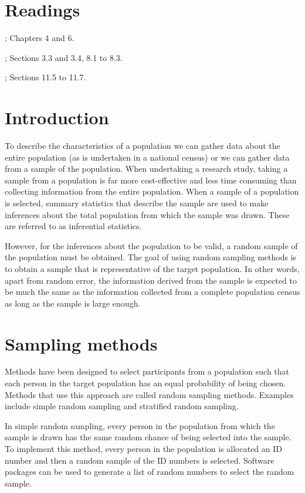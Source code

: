 \documentclass[
]{memoir}
\begin{document}
\hypertarget{readings-2}{%
\section*{Readings}\label{readings-2}}

\citet{kirkwood_sterne01}; Chapters 4 and 6.

\citet{bland15}; Sections 3.3 and 3.4, 8.1 to 8.3.

\citet{juul_frydenberg14}; Sections 11.5 to 11.7.

\hypertarget{introduction}{%
\section{Introduction}\label{introduction}}

To describe the characteristics of a population we can gather data about the entire population (as is undertaken in a national census) or we can gather data from a sample of the population. When undertaking a research study, taking a sample from a population is far more cost-effective and less time consuming than collecting information from the entire population. When a sample of a population is selected, summary statistics that describe the sample are used to make inferences about the total population from which the sample was drawn. These are referred to as inferential statistics.

However, for the inferences about the population to be valid, a random sample of the population must be obtained. The goal of using random sampling methods is to obtain a sample that is representative of the target population. In other words, apart from random error, the information derived from the sample is expected to be much the same as the information collected from a complete population census as long as the sample is large enough.

\hypertarget{sampling-methods}{%
\section{Sampling methods}\label{sampling-methods}}

Methods have been designed to select participants from a population such that each person in the target population has an equal probability of being chosen. Methods that use this approach are called random sampling methods. Examples include simple random sampling and stratified random sampling.

In simple random sampling, every person in the population from which the sample is drawn has the same random chance of being selected into the sample. To implement this method, every person in the population is allocated an ID number and then a random sample of the ID numbers is selected. Software packages can be used to generate a list of random numbers to select the random sample.
\end{document}
